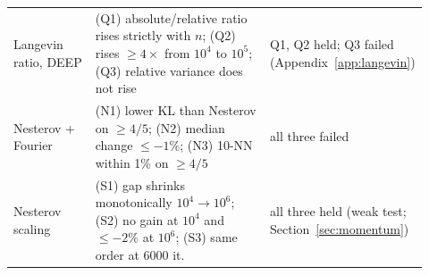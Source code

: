 \begin{tabular}{p{0.22\linewidth}p{0.50\linewidth}p{0.20\linewidth}}
Langevin ratio, DEEP & (Q1) absolute/relative ratio rises strictly with $n$; (Q2) rises $\ge4\times$ from $10^4$ to $10^5$; (Q3) relative variance does not rise & Q1, Q2 held; Q3 failed (Appendix~\ref{app:langevin})\\
Nesterov + Fourier & (N1) lower KL than Nesterov on $\ge4/5$; (N2) median change $\le-1\%$; (N3) 10-NN within 1\% on $\ge4/5$ & all three failed\\
Nesterov scaling & (S1) gap shrinks monotonically $10^4\to10^6$; (S2) no gain at $10^4$ and $\le-2\%$ at $10^6$; (S3) same order at 6000 it. & all three held (weak test; Section~\ref{sec:momentum})\\
\bottomrule\end{tabular}
